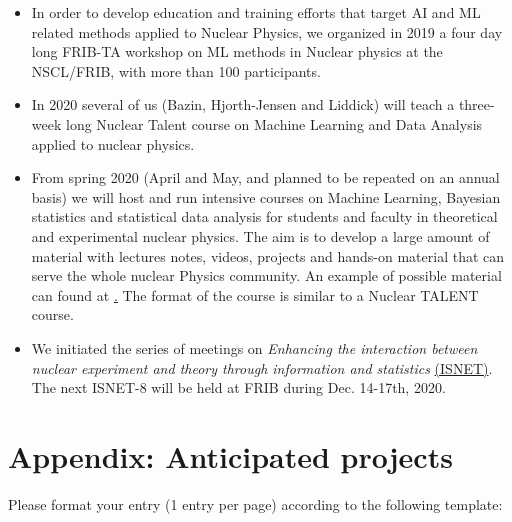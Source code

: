 \documentclass[%
10pt]{article}
\begin{document}
\begin{itemize}

\item In order to develop education and training efforts that target AI and ML related methods applied to Nuclear Physics, we  organized in 2019 a four day long  FRIB-TA workshop on ML methods in Nuclear physics at the NSCL/FRIB, with more than 100 participants.

\item In 2020 several of us (Bazin, Hjorth-Jensen and Liddick) will teach a three-week long Nuclear Talent course on Machine Learning and Data Analysis applied to nuclear physics. 


\item From spring 2020 (April and May, and planned to be repeated on an annual basis) we will host and run intensive courses on Machine Learning, Bayesian statistics and statistical data analysis for students and faculty in theoretical and experimental nuclear physics. The aim is to develop a large amount of material with lectures notes, videos, projects and hands-on material that can serve the whole nuclear Physics community. An example of possible material can found at \href{https://compphysics.github.io/MachineLearning/doc/web/course.html}.  The format of the course is similar to a Nuclear TALENT course.

\item
We initiated the series of meetings on {\it Enhancing the interaction between nuclear experiment and theory through information and statistics} \href{https://iopscience.iop.org/journal/0954-3899/page/ISNET}{(ISNET)}.  The next ISNET-8 will be held at FRIB during  Dec. 14-17th, 2020.

\end{itemize}

\clearpage
\newpage

\section{Appendix: Anticipated projects}

Please format your entry (1 entry per page) according to the following template:
\end{document}
